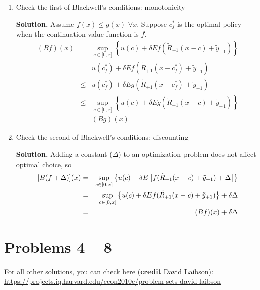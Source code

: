 \documentclass[11pt]{extarticle}
\theoremstyle{plain}
\theoremstyle{definition}
\begin{document}
\vspace{10mm}
\noindent
\begin{enumerate}
\item Check the first of Blackwell's conditions: monotonicity

\textbf{Solution.} Assume $f(x)\leq g(x)$ $\forall x$. Suppose $%
c_{f}^{\ast }$ is the optimal policy when the continuation value function is 
$f.$%
\begin{eqnarray*}
	(Bf)(x) &=&\sup_{c\in \lbrack 0,x]}\left\{ u(c)+\delta Ef(\tilde{R}%
	_{+1}(x-c)+\tilde{y}_{+1})\right\} \\
	&=&u(c_{f}^{\ast })+\delta Ef(\tilde{R}_{+1}(x-c_{f}^{\ast })+\tilde{y}_{+1})
	\\
	&\leq &u(c_{f}^{\ast })+\delta Eg(\tilde{R}_{+1}(x-c_{f}^{\ast })+\tilde{y}%
	_{+1}) \\
	&\leq &\sup_{c\in \lbrack 0,x]}\left\{ u(c)+\delta Eg(\tilde{R}_{+1}(x-c)+%
	\tilde{y}_{+1})\right\} \\
	&=&(Bg)(x)
\end{eqnarray*}

\item Check the second of Blackwell's conditions: discounting

\textbf{Solution.} Adding a constant ($\Delta $) to an optimization problem does not affect optimal choice, so
\begin{eqnarray*}
	\lbrack B(f+\Delta )](x) &=&\sup_{c\in \lbrack 0,x]}\left\{ u(c)+\delta E 
	\left[ f(\tilde{R}_{+1}(x-c)+\tilde{y}_{+1})+\Delta \right] \right\} \\
	&=&\sup_{c\in \lbrack 0,x]}\left\{ u(c)+\delta Ef(\tilde{R}_{+1}(x-c)+\tilde{%
		y}_{+1})\right\} +\delta \Delta \\
	&=&(Bf)(x)+\delta \Delta
\end{eqnarray*}

\end{enumerate}





\vspace{10mm}
\section*{Problems 4 -- 8}

For all other solutions, you can check here (\textbf{credit} David Laibson):
\url{https://projects.iq.harvard.edu/econ2010c/problem-sets-david-laibson}
\end{document}
